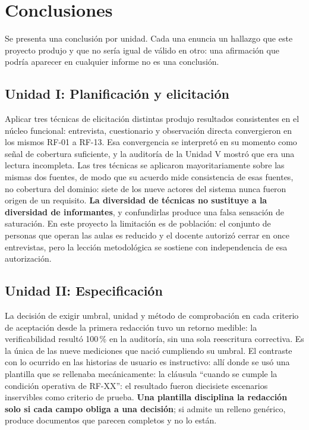 \section{Conclusiones}

Se presenta una conclusi\'on por unidad. Cada una enuncia un hallazgo que este proyecto produjo y que no ser\'ia igual de v\'alido en otro: una afirmaci\'on que podr\'ia aparecer en cualquier informe no es una conclusi\'on.

\subsection{Unidad I: Planificaci\'on y elicitaci\'on}

Aplicar tres t\'ecnicas de elicitaci\'on distintas produjo resultados consistentes en el n\'ucleo funcional: entrevista, cuestionario y observaci\'on directa convergieron en los mismos RF-01 a RF-13. Esa convergencia se interpret\'o en su momento como se\~nal de cobertura suficiente, y la auditor\'ia de la Unidad V mostr\'o que era una lectura incompleta. Las tres t\'ecnicas se aplicaron mayoritariamente sobre las mismas dos fuentes, de modo que su acuerdo mide consistencia de esas fuentes, no cobertura del dominio: siete de los nueve actores del sistema nunca fueron origen de un requisito. \textbf{La diversidad de t\'ecnicas no sustituye a la diversidad de informantes}, y confundirlas produce una falsa sensaci\'on de saturaci\'on. En este proyecto la limitaci\'on es de poblaci\'on: el conjunto de personas que operan las aulas es reducido y el docente autoriz\'o cerrar en once entrevistas, pero la lecci\'on metodol\'ogica se sostiene con independencia de esa autorizaci\'on.

\subsection{Unidad II: Especificaci\'on}

La decisi\'on de exigir umbral, unidad y m\'etodo de comprobaci\'on en cada criterio de aceptaci\'on desde la primera redacci\'on tuvo un retorno medible: la verificabilidad result\'o 100\,\% en la auditor\'ia, sin una sola reescritura correctiva. Es la \'unica de las nueve mediciones que naci\'o cumpliendo su umbral. El contraste con lo ocurrido en las historias de usuario es instructivo: all\'i donde se us\'o una plantilla que se rellenaba mec\'anicamente: la cl\'ausula ``cuando se cumple la condici\'on operativa de RF-XX'': el resultado fueron diecisiete escenarios inservibles como criterio de prueba. \textbf{Una plantilla disciplina la redacci\'on solo si cada campo obliga a una decisi\'on}; si admite un relleno gen\'erico, produce documentos que parecen completos y no lo est\'an.

